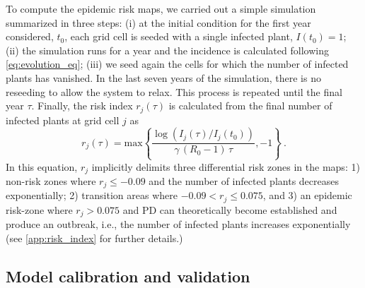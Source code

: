 To compute the epidemic risk maps, we carried out a simple simulation
summarized in three steps: (i) at the initial condition for the first year
considered, $t_0$, each grid cell is seeded with a single infected plant,
$I(t_0)=1$; (ii) the simulation runs for a year and the incidence is calculated
following \cref{eq:evolution_eq}; (iii) we seed again the cells for which
the
number of infected plants has vanished. In the last seven years of the
simulation, there is no reseeding to allow the system to relax. This
process is
repeated until the final year $\tau$. Finally, the risk index
$r_j(\tau)$ is calculated from the final number of infected plants at
grid cell $j$ as
\begin{equation}
    r_j(\tau)=\textrm{max}\left\{\frac{
        \log(I_j(\tau)/I_j(t_0))}{\gamma\,
        (R_0-1)\, \tau}, -1 \right\} \ .
    \label{eq:riskmeasure}
\end{equation}
In this equation, $r_j$ implicitly delimits three differential risk zones
in the maps: 1) non-risk zones where $r_j \le -0.09$ and the number of
infected plants decreases exponentially; 2) transition areas where $-0.09 <
    r_j
    \le 0.075 $, and 3) an epidemic risk-zone where $ r_j >0.075$ and PD can
theoretically become established and produce an outbreak, i.e., the number of
infected plants increases exponentially (see \cref{app:risk_index} for
further details.)

\subsection{Model calibration and validation}

